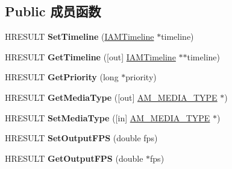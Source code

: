 \subsection*{Public 成员函数}
\begin{DoxyCompactItemize}
\item 
\mbox{\label{interface_i_a_m_timeline_group_a407f5490e5c03d56d57b68dfd06af933}} 
H\+R\+E\+S\+U\+LT {\bfseries Set\+Timeline} (\hyperlink{interface_i_a_m_timeline}{I\+A\+M\+Timeline} $\ast$timeline)
\item 
\mbox{\label{interface_i_a_m_timeline_group_a22c87cbf20cab27ac096e447681bb0c5}} 
H\+R\+E\+S\+U\+LT {\bfseries Get\+Timeline} (\mbox{[}out\mbox{]} \hyperlink{interface_i_a_m_timeline}{I\+A\+M\+Timeline} $\ast$$\ast$timeline)
\item 
\mbox{\label{interface_i_a_m_timeline_group_aec6c49536dcafc638b85fdcbdd5fcb40}} 
H\+R\+E\+S\+U\+LT {\bfseries Get\+Priority} (long $\ast$priority)
\item 
\mbox{\label{interface_i_a_m_timeline_group_ae33633474bab1604c72a4f719d4bfe40}} 
H\+R\+E\+S\+U\+LT {\bfseries Get\+Media\+Type} (\mbox{[}out\mbox{]} \hyperlink{struct_a_m___m_e_d_i_a___t_y_p_e}{A\+M\+\_\+\+M\+E\+D\+I\+A\+\_\+\+T\+Y\+PE} $\ast$)
\item 
\mbox{\label{interface_i_a_m_timeline_group_aa4a65894492b6385141be4d0b8522c79}} 
H\+R\+E\+S\+U\+LT {\bfseries Set\+Media\+Type} (\mbox{[}in\mbox{]} \hyperlink{struct_a_m___m_e_d_i_a___t_y_p_e}{A\+M\+\_\+\+M\+E\+D\+I\+A\+\_\+\+T\+Y\+PE} $\ast$)
\item 
\mbox{\label{interface_i_a_m_timeline_group_af38d7a3b9c5191ce8454a02555a14f8c}} 
H\+R\+E\+S\+U\+LT {\bfseries Set\+Output\+F\+PS} (double fps)
\item 
\mbox{\label{interface_i_a_m_timeline_group_a4fe4241618508dd0af4e6bc8e9fdc2a6}} 
H\+R\+E\+S\+U\+LT {\bfseries Get\+Output\+F\+PS} (double $\ast$fps)
\item 
\mbox{\label{interface_i_a_m_timeline_group_a4e6845efa980b583c6b305c605f20ba9}} 
$$
\end{DoxyCompactItemize}
